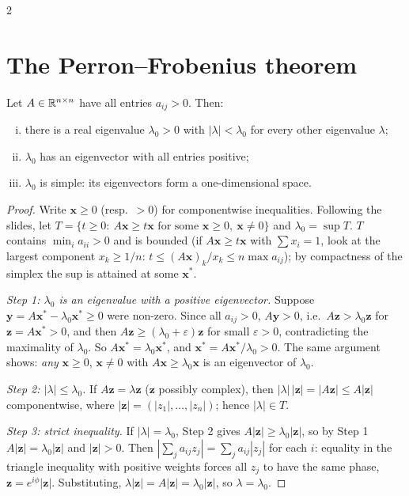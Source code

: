 \begin{paracol}{2}
\begin{mysolution}
\end{mysolution}

\section{The Perron--Frobenius theorem}\label{sec:pf}

\begin{theorem}\label{thm:pf}
Let $A\in\mathbb{R}^{n\times n}$ have all entries $a_{ij}>0$. Then:
\begin{enumerate}[(i)]
  \item there is a real eigenvalue $\lambda_0>0$ with $|\lambda|<\lambda_0$ for every other eigenvalue $\lambda$;
  \item $\lambda_0$ has an eigenvector with all entries positive;
  \item $\lambda_0$ is simple: its eigenvectors form a one-dimensional space.
\end{enumerate}
\end{theorem}
\begin{proof}
Write $\bm x\ge0$ (resp.\ $>0$) for componentwise inequalities. Following the slides, let
$T=\{t\ge0:\ A\bm x\ge t\bm x\text{ for some }\bm x\ge0,\ \bm x\ne0\}$ and $\lambda_0=\sup T$.
$T$ contains $\min_ia_{ii}>0$ and is bounded (if $A\bm x\ge t\bm x$ with $\sum x_i=1$, look at the largest
component $x_k\ge1/n$: $t\le(A\bm x)_k/x_k\le n\max a_{ij}$); by compactness of the simplex the sup is attained
at some $\bm x^*$.

\emph{Step 1: $\lambda_0$ is an eigenvalue with a positive eigenvector.} Suppose $\bm y=A\bm x^*-\lambda_0\bm x^*\ge0$ were
non-zero. Since all $a_{ij}>0$, $A\bm y>0$, i.e.\ $A\bm z>\lambda_0\bm z$ for $\bm z=A\bm x^*>0$, and then
$A\bm z\ge(\lambda_0+\varepsilon)\bm z$ for small $\varepsilon>0$, contradicting the maximality of $\lambda_0$. So
$A\bm x^*=\lambda_0\bm x^*$, and $\bm x^*=A\bm x^*/\lambda_0>0$. The same argument shows: \emph{any} $\bm x\ge0$, $\bm x\neq0$ with
$A\bm x\ge\lambda_0\bm x$ is an eigenvector of $\lambda_0$.

\emph{Step 2: $|\lambda|\le\lambda_0$.} If $A\bm z=\lambda\bm z$ ($\bm z$ possibly complex), then
$|\lambda|\,|\bm z|=|A\bm z|\le A|\bm z|$ componentwise, where $|\bm z|=(|z_1|,\dots,|z_n|)$; hence $|\lambda|\in T$.

\emph{Step 3: strict inequality.} If $|\lambda|=\lambda_0$, Step 2 gives $A|\bm z|\ge\lambda_0|\bm z|$, so by Step 1
$A|\bm z|=\lambda_0|\bm z|$ and $|\bm z|>0$. Then $|\sum_ja_{ij}z_j|=\sum_ja_{ij}|z_j|$ for each $i$: equality in the
triangle inequality with positive weights forces all $z_j$ to have the same phase, $\bm z=e^{i\phi}|\bm z|$.
Substituting, $\lambda|\bm z|=A|\bm z|=\lambda_0|\bm z|$, so $\lambda=\lambda_0$.


\end{proof}
\end{paracol}
